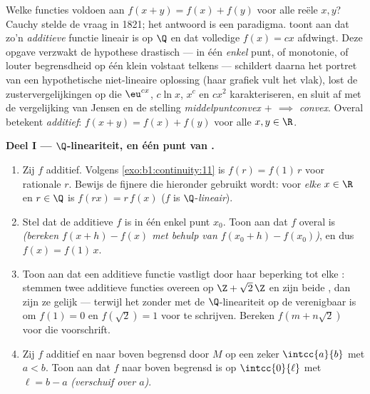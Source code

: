 \begin{problem}[{Weekendopgave --- $f(x + y) = f(x) + f(y)$: regelmaat
dwingt lineariteit af, en het portret van de monsters}]
\label{pb:b1:continuity:1}
Welke functies voldoen aan $f(x + y) = f(x) + f(y)$ voor alle reële $x,
y$? Cauchy stelde de vraag in 1821; het antwoord is een paradigma.
 toont aan dat zo'n \emph{additieve} functie
lineair is op $\Q$ en dat volledige  $f(x) = cx$ afdwingt.
Deze opgave verzwakt de hypothese drastisch ---  in één
\emph{enkel} punt, of monotonie, of louter begrensdheid op één klein
 volstaat telkens --- schildert daarna het portret van een
hypothetische niet-lineaire oplossing (haar grafiek vult het vlak), lost
de zustervergelijkingen op die $\eu^{cx}$, $c\ln x$, $x^c$ en $cx^2$
karakteriseren, en sluit af met de vergelijking van Jensen en de stelling
\emph{middelpuntconvex $+$  $\implies$
convex}.
Overal betekent \emph{additief}: $f(x + y) = f(x) + f(y)$ voor alle $x, y
\in \R$.

\medskip
\noindent\textbf{Deel I --- $\Q$-lineariteit, en één punt van
.}
\begin{enumerate}
  \item Zij $f$ additief. Volgens \cref{exo:b1:continuity:11} is $f(r) =
        f(1)\,r$ voor rationale $r$. Bewijs de fijnere  die
        hieronder gebruikt wordt: voor \emph{elke} $x \in \R$ en $r \in
        \Q$ is $f(rx) = r\,f(x)$ ($f$ is $\Q$-\emph{lineair}).
  \item Stel dat de additieve $f$  is in één enkel punt $x_0$.
        Toon aan dat $f$ overal  is \emph{(bereken $f(x + h) -
        f(x)$ met behulp van $f(x_0 + h) - f(x_0)$)}, en dus $f(x) =
        f(1)\,x$.
  \item Toon aan dat een additieve functie vastligt door haar beperking
        tot elke  : stemmen twee additieve functies
        overeen op $\Z + \sqrt2\,\Z$ en zijn beide , dan zijn ze
        gelijk --- terwijl het zonder  met de
        $\Q$-lineariteit op de  verenigbaar is om $f(1) = 0$ en
        $f(\sqrt 2) = 1$ voor te schrijven. Bereken $f(m + n\sqrt2)$
        voor die voorschrift.
  \item Zij $f$ additief en naar boven begrensd door $M$ op een zeker
         $\intcc{a}{b}$ met $a < b$. Toon aan dat $f$ naar boven
        begrensd is op $\intcc{0}{\ell}$ met $\ell = b - a$
        \emph{(verschuif over $a$)}.
\end{enumerate}


\end{problem}
